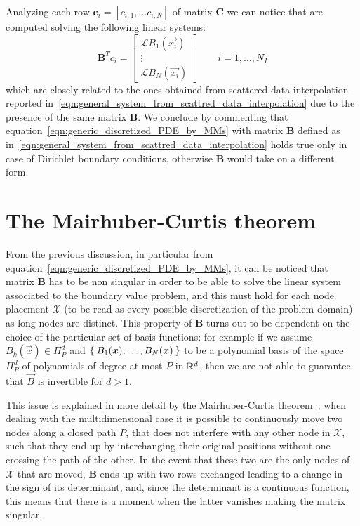Analyzing each row $\boldsymbol{c}_i = [c_{i,1}, \dots c_{i,N}]$ of matrix $\boldsymbol{C}$ we can notice that are computed solving the following linear systems:
\begin{equation}
	\boldsymbol{B}^T c_i = 
	\begin{bmatrix}
		\mathcal{L} B_1(\vec{x_i})  \\
		\vdots											  \\
		\mathcal{L} B_N(\vec{x_i})
	\end{bmatrix}
	\qquad i=1, \dots, N_I
\end{equation}
which are closely related to the ones obtained from scattered data interpolation reported in~\eqref{eqn:general_system_from_scattred_data_interpolation} due to the presence of the same matrix $\boldsymbol{B}$. We conclude by commenting that equation~\eqref{eqn:generic_discretized_PDE_by_MMs} with matrix $\boldsymbol{B}$ defined as in~\eqref{eqn:general_system_from_scattred_data_interpolation} holds true only in case of Dirichlet boundary conditions, otherwise $\boldsymbol{B}$ would take on a different form.



\section{The Mairhuber-Curtis theorem}

From the previous discussion, in particular from equation~\eqref{eqn:generic_discretized_PDE_by_MMs}, it can be noticed that matrix $\boldsymbol{B}$ has to be non singular in order to be able to solve the linear system associated to the boundary value problem, and this must hold for each node placement $\mathcal{X}$ (to be read as every possible discretization of the problem domain) as long nodes are distinct. This property of $\boldsymbol{B}$ turns out to be dependent on the choice of the particular set of basis functions: for example if we assume $B_k(\vec{x})\in\Pi_P^d$ and $\Set{B_1(\boldsymbol{x}), \dots, B_N(\boldsymbol{x})}$ to be a polynomial basis of the space $\Pi_P^d$ of polynomials of degree at most $P$ in $\mathbb{R}^d$, then we are not able to guarantee that $\vec{B}$ is invertible for $d>1$.

This issue is explained in more detail by the Mairhuber-Curtis theorem~\cite{Mairhuber:interpolation_basis_problem}; when dealing with the multidimensional case it is possible to continuously move two nodes along a closed path $P$, that does not interfere with any other node in $\mathcal{X}$, such that they end up by interchanging their original positions without one crossing the path of the other. In the event that these two are the only nodes of $\mathcal{X}$ that are moved, $\boldsymbol{B}$ ends up with two rows exchanged leading to a change in the sign of its determinant, and, since the determinant is a continuous function, this means that there is a moment when the latter vanishes making the matrix singular.

